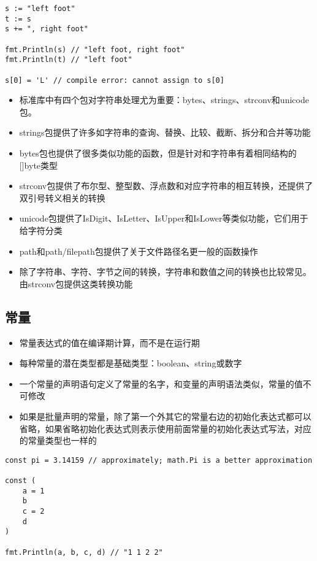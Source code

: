 \begin{verbatim}
s := "left foot"
t := s
s += ", right foot"

fmt.Println(s) // "left foot, right foot"
fmt.Println(t) // "left foot"

s[0] = 'L' // compile error: cannot assign to s[0]
\end{verbatim}

\begin{itemize}
\tightlist
\item
  标准库中有四个包对字符串处理尤为重要：bytes、strings、strconv和unicode包。
\item
  strings包提供了许多如字符串的查询、替换、比较、截断、拆分和合并等功能
\item
  bytes包也提供了很多类似功能的函数，但是针对和字符串有着相同结构的{[}{]}byte类型
\item
  strconv包提供了布尔型、整型数、浮点数和对应字符串的相互转换，还提供了双引号转义相关的转换
\item
  unicode包提供了IsDigit、IsLetter、IsUpper和IsLower等类似功能，它们用于给字符分类
\item
  path和path/filepath包提供了关于文件路径名更一般的函数操作
\item
  除了字符串、字符、字节之间的转换，字符串和数值之间的转换也比较常见。由strconv包提供这类转换功能
\end{itemize}

\hypertarget{ux5e38ux91cf}{%
\subsection{常量}\label{ux5e38ux91cf}}

\begin{itemize}
\tightlist
\item
  常量表达式的值在编译期计算，而不是在运行期
\item
  每种常量的潜在类型都是基础类型：boolean、string或数字
\item
  一个常量的声明语句定义了常量的名字，和变量的声明语法类似，常量的值不可修改
\item
  如果是批量声明的常量，除了第一个外其它的常量右边的初始化表达式都可以省略，如果省略初始化表达式则表示使用前面常量的初始化表达式写法，对应的常量类型也一样的
\end{itemize}

\begin{verbatim}
const pi = 3.14159 // approximately; math.Pi is a better approximation

const (
    a = 1
    b
    c = 2
    d
)

fmt.Println(a, b, c, d) // "1 1 2 2"
\end{verbatim}

